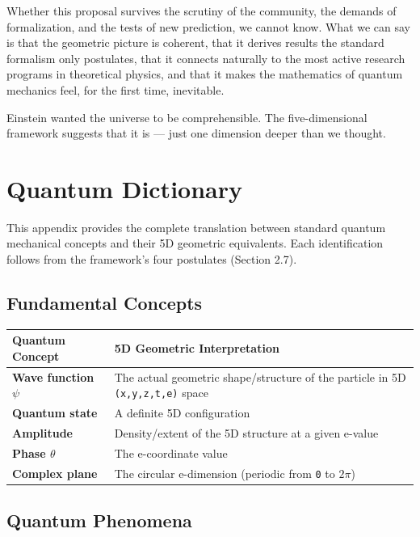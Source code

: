 \documentclass[aps,prd,preprint,superscriptaddress,longbibliography,floatfix]{revtex4-2}
\theoremstyle{remark}
\begin{document}
Whether this proposal survives the scrutiny of the community, the demands of formalization, and the tests of new prediction, we cannot know. What we can say is that the geometric picture is coherent, that it derives results the standard formalism only postulates, that it connects naturally to the most active research programs in theoretical physics, and that it makes the mathematics of quantum mechanics feel, for the first time, inevitable.

Einstein wanted the universe to be comprehensible. The five-dimensional framework suggests that it is --- just one dimension deeper than we thought.



\appendix


\section{Quantum Dictionary}

This appendix provides the complete translation between standard quantum mechanical concepts and their 5D geometric equivalents. Each identification follows from the framework's four postulates (Section 2.7).


\subsection{Fundamental Concepts}


\begin{table}[H]
\begin{ruledtabular}
\begin{tabular}{p{7.5cm}p{7.5cm}}
Quantum Concept & 5D Geometric Interpretation \\
\hline
\textbf{Wave function $\psi$} & The actual geometric shape/structure of the particle in 5D \texttt{(x,y,z,t,e)} space \\
\textbf{Quantum state} & A definite 5D configuration \\
\textbf{Amplitude} & Density/extent of the 5D structure at a given e-value \\
\textbf{Phase $\theta$} & The e-coordinate value \\
\textbf{Complex plane} & The circular e-dimension (periodic from \texttt{0} to $2\pi$) \\
\end{tabular}
\end{ruledtabular}
\end{table}


\subsection{Quantum Phenomena}
\end{document}

